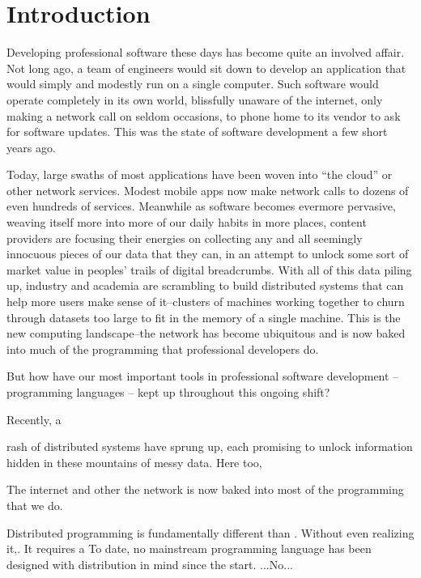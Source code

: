 \chapter{Introduction}

Developing professional software these days has become quite an involved affair.
Not long ago, a team of engineers would sit down to develop an application that
would simply and modestly run on a single computer. Such software would operate
completely in its own world, blissfully unaware of the internet, only making a
network call on seldom occasions, \eg to phone home to its vendor to ask for
software updates. This was the state of software development a few short years
ago.


Today, large swaths of most applications have been woven into ``the cloud'' or
other network services. Modest mobile apps now make network calls to dozens of
even hundreds of services. Meanwhile as software becomes evermore pervasive,
weaving itself more into more of our daily habits in more places, content
providers are focusing their energies on collecting any and all seemingly
innocuous pieces of our data that they can, in an attempt to unlock some sort of
market value in peoples' trails of digital breadcrumbs. With all of this data
piling up, industry and academia are scrambling to build distributed systems
that can help more users make sense of it--clusters of machines working together
to churn through datasets too large to fit in the memory of a single machine.
This is the new computing landscape--the network has become ubiquitous and is
now baked into much of the programming that professional developers do.

But how have our most important tools in professional software development --
programming languages -- kept up throughout this ongoing shift?



 Recently, a

 rash of distributed systems have
sprung up, each promising to unlock information hidden in these mountains of
messy data. Here too,

The internet and other the network is
now baked into most of the programming that we do.


Distributed programming is fundamentally different than . Without even realizing
it,. It requires a
To date, no mainstream programming language has been designed with distribution in mind since the start. ...No...

